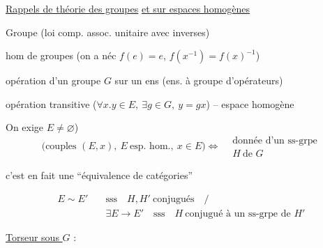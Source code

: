 \uline{Rappels de théorie des groupes} \uline{et sur espaces homogènes}

Groupe (loi comp. assoc. unitaire avec inverses)

hom de groupes (on a néc $f(e)=e$, $f(x^{-1})=f(x)^{-1}$)

opération d'un groupe $G$ sur un ens (ens. à groupe d'opérateurs)

opération transitive ($\forall x\mathord{.}y\in E,\ \exists g\in G,\ y=gx$) -- espace homogène

On exige   $E\ne\varnothing$)
\[
\bigl(\text{couples }(E,x),\ E\ \text{esp. hom.},\ x\in E\bigr)
\Longleftrightarrow
\begin{aligned}&\text{donnée d'un ss-grpe}\\&H\ \text{de }G\end{aligned}
\]

c'est en fait une ``équivalence de catégories''

{\small
{}}
{\small
\[
\begin{aligned}
E\sim E' \quad &\text{sss}\quad H,H'\ \text{conjugués}\quad \big/\\[-2pt]
&\exists E\to E'\quad\text{sss}\quad H\ \text{conjugué à un ss-grpe de }H'
\end{aligned}
\]}

\uline{Torseur sous $G$} :
{\small
{}}

